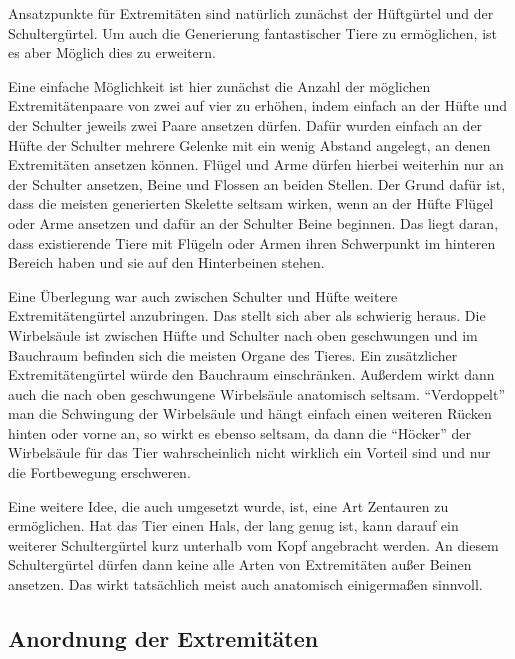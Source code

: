 Ansatzpunkte für Extremitäten sind natürlich zunächst der Hüftgürtel und der Schultergürtel. Um auch die Generierung fantastischer Tiere zu ermöglichen, ist es aber Möglich dies zu erweitern.\\

Eine einfache Möglichkeit ist hier zunächst die Anzahl der möglichen Extremitätenpaare von zwei auf vier zu erhöhen, indem einfach an der Hüfte und der Schulter jeweils zwei Paare ansetzen dürfen. Dafür wurden einfach an der Hüfte \bzw der Schulter mehrere Gelenke mit ein wenig Abstand angelegt, an denen Extremitäten ansetzen können.
Flügel und Arme dürfen hierbei weiterhin nur an der Schulter ansetzen, Beine und Flossen an beiden Stellen. Der Grund dafür ist, dass die meisten generierten Skelette seltsam wirken, wenn an der Hüfte Flügel oder Arme ansetzen und dafür an der Schulter Beine beginnen. Das liegt daran, dass existierende Tiere mit Flügeln oder Armen ihren Schwerpunkt im hinteren Bereich haben und sie auf den Hinterbeinen stehen.

Eine Überlegung war auch zwischen Schulter und Hüfte weitere Extremitätengürtel anzubringen. Das stellt sich aber als schwierig heraus. Die Wirbelsäule ist zwischen Hüfte und Schulter nach oben geschwungen und im Bauchraum befinden sich die meisten Organe des Tieres. Ein zusätzlicher Extremitätengürtel würde den Bauchraum einschränken. Außerdem wirkt dann auch die nach oben geschwungene Wirbelsäule anatomisch seltsam.
"`Verdoppelt"' man die Schwingung der Wirbelsäule und hängt einfach einen weiteren Rücken hinten oder vorne an, so wirkt es ebenso seltsam, da dann die "`Höcker"' der Wirbelsäule für das Tier wahrscheinlich nicht wirklich ein Vorteil sind und nur die Fortbewegung erschweren.

Eine weitere Idee, die auch umgesetzt wurde, ist, eine Art Zentauren zu ermöglichen. Hat das Tier einen Hals, der lang genug ist, kann darauf ein weiterer Schultergürtel kurz unterhalb vom Kopf angebracht werden. An diesem Schultergürtel dürfen dann keine alle Arten von Extremitäten außer Beinen ansetzen. Das wirkt tatsächlich meist auch anatomisch einigermaßen sinnvoll.

\subsection{Anordnung der Extremitäten}


